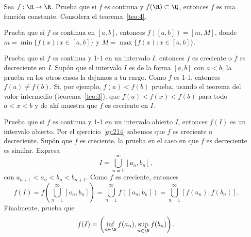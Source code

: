 \documentclass[12pt,a4paper]{book}
\begin{document}
    \begin{ejercicio}\label{ej:212}
        Sea $f:\R\to\R$. Prueba que si $f$ es continua y $f(\R)\subset\Q$,
        entonces $f$ es una función constante. \sugerencia Considera el teorema~\ref{teo:4}.
    \end{ejercicio}

    \begin{ejercicio}\label{ej:213}
        Prueba que si $f$ es continua
        en $[a,b]$, entonces $f([a,b])=[m,M]$, donde $m=\min\{f(x):x\in[a,b]\}$
        y $M=\max\{f(x):x\in[a,b]\}$.
    \end{ejercicio}

    \begin{ejercicio}\label{ej:214}
        Prueba que si $f$ es continua
        y 1-1 en un intervalo $I$, entonces $f$ es creciente o $f$ es decreciente en $I$.
        \sugerencia Supón que el intervalo $I$ es de la forma $[a,b]$ con $a<b$, la
        prueba en los otros casos la dejamos a tu cargo. Como $f$ es 1-1, entonces
        $f(a)\neq f(b)$. Si, por ejemplo, $f(a)<f(b)$ prueba, usando el teorema del
        valor intermedio (teorema~\ref{teo:3}), que $f(a)<f(x)<f(b)$ para todo $a<x<b$
        y de ahí muestra que $f$ es creciente en $I$.
    \end{ejercicio}

    \begin{ejercicio}\label{ej:215}
        Prueba que si $f$ es continua y 1-1 en
        un intervalo abierto $I$, entonces $f(I)$ es un intervalo abierto. \sugerencia
        Por el ejercicio~\ref{ej:214} sabemos que $f$ es creciente o decreciente. Supón que $f$ es
        creciente, la prueba en el caso en que $f$ es decreciente es similar. Expresa
        \begin{equation*}
            I=\bigcup_{n=1}^{\infty}[a_{n},b_{n}],
        \end{equation*}
        con $a_{n+1}<a_{n}<b_{n}<b_{n+1}$. Como $f$ es creciente, entonces
        \begin{equation*}
            f(I)=f\left(\bigcup_{n=1}^{\infty}[a_{n},b_{n}]\right)=\bigcup_{n=1}^{\infty}f([a_{n},b_{n}])=\bigcup_{n=1}^{\infty}[f(a_{n}),f(b_{n})].
        \end{equation*}
        Finalmente, prueba que
        \begin{equation*}
            f(I)=\left(\inf_{n\in\N}f(a_{n}),\sup_{n\in\N}f(b_{n})\right).
        \end{equation*}
    \end{ejercicio}
\end{document}
